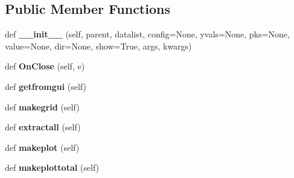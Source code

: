 \subsection*{Public Member Functions}
\begin{DoxyCompactItemize}
\item 
\hypertarget{class_uni_dec_1_1unidec__modules_1_1_mass_defects_1_1_mass_defect_window_abd9552af6b3f9f66aef91277040b1800}{}def {\bfseries \+\_\+\+\_\+init\+\_\+\+\_\+} (self, parent, datalist, config=None, yvals=None, pks=None, value=None, dir=None, show=True, args, kwargs)\label{class_uni_dec_1_1unidec__modules_1_1_mass_defects_1_1_mass_defect_window_abd9552af6b3f9f66aef91277040b1800}

\item 
\hypertarget{class_uni_dec_1_1unidec__modules_1_1_mass_defects_1_1_mass_defect_window_a3f4a5fd4900231beb71ec527c10bc704}{}def {\bfseries On\+Close} (self, e)\label{class_uni_dec_1_1unidec__modules_1_1_mass_defects_1_1_mass_defect_window_a3f4a5fd4900231beb71ec527c10bc704}

\item 
\hypertarget{class_uni_dec_1_1unidec__modules_1_1_mass_defects_1_1_mass_defect_window_ae13b14a55176c3948e790ce3f14bb491}{}def {\bfseries getfromgui} (self)\label{class_uni_dec_1_1unidec__modules_1_1_mass_defects_1_1_mass_defect_window_ae13b14a55176c3948e790ce3f14bb491}

\item 
\hypertarget{class_uni_dec_1_1unidec__modules_1_1_mass_defects_1_1_mass_defect_window_a71e175efc1af02f2082dac7f5f645df0}{}def {\bfseries makegrid} (self)\label{class_uni_dec_1_1unidec__modules_1_1_mass_defects_1_1_mass_defect_window_a71e175efc1af02f2082dac7f5f645df0}

\item 
\hypertarget{class_uni_dec_1_1unidec__modules_1_1_mass_defects_1_1_mass_defect_window_ab83ed920620144caaf3cf7f0368c16a7}{}def {\bfseries extractall} (self)\label{class_uni_dec_1_1unidec__modules_1_1_mass_defects_1_1_mass_defect_window_ab83ed920620144caaf3cf7f0368c16a7}

\item 
\hypertarget{class_uni_dec_1_1unidec__modules_1_1_mass_defects_1_1_mass_defect_window_a94573d37d64c826e9fb7ef98eec7b0c0}{}def {\bfseries makeplot} (self)\label{class_uni_dec_1_1unidec__modules_1_1_mass_defects_1_1_mass_defect_window_a94573d37d64c826e9fb7ef98eec7b0c0}

\item 
\hypertarget{class_uni_dec_1_1unidec__modules_1_1_mass_defects_1_1_mass_defect_window_a95624bd5fd2de685c507d2ed85195523}{}def {\bfseries makeplottotal} (self)\label{class_uni_dec_1_1unidec__modules_1_1_mass_defects_1_1_mass_defect_window_a95624bd5fd2de685c507d2ed85195523}


\end{DoxyCompactItemize}
